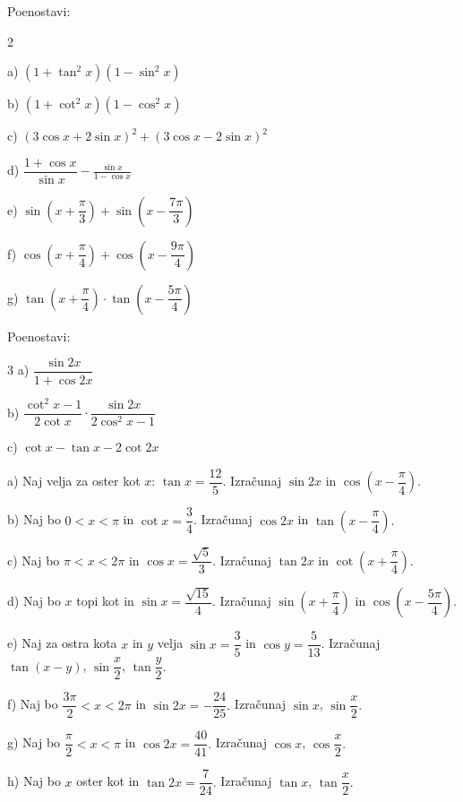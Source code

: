 \documentclass[a4paper,12pt]{letter}
\begin{document}
\begin{naloga}
Poenostavi:

    \vspace{-.5cm}
    
\begin{multicols}{2}
    
a) $(1+\tan^2 x)(1-\sin^2 x)$

b) $(1+\cot^2 x)(1-\cos^2 x)$

c) $(3\cos x+2\sin x)^2+(3\cos x-2\sin x)^2$

d) $\dfrac{1+\cos x}{\sin x}-\frac{\sin x}{1-\cos x}$

e) $\sin\left(x+\dfrac{\pi}{3}\right)+\sin\left(x-\dfrac{7\pi}{3}\right)$

f) $\cos\left(x+\dfrac{\pi}{4}\right)+\cos\left(x-\dfrac{9\pi}{4}\right)$

g) $\tan\left(x+\dfrac{\pi}{4}\right)\cdot \tan\left(x-\dfrac{5\pi}{4}\right) $
    
\end{multicols}
\end{naloga}
\begin{naloga}
    Poenostavi:
    \vspace{-.5cm}
    
\begin{multicols}
    {3}
        a) $\dfrac{\sin 2x}{1+\cos 2x}$

    b) $\dfrac{\cot^2 x -1}{2\cot x}\cdot \dfrac{\sin 2x}{2\cos^2 x-1}$

    c) $\cot x- \tan x -2\cot 2x$
\end{multicols}

\end{naloga}
\begin{naloga}
    a) Naj velja za oster kot $x$:  $\tan x=\dfrac{12}{5}$. Izračunaj $\sin 2x$  in $\cos(x-\dfrac{\pi}{4}).$

    b) Naj bo $0<x<\pi$ in   $\cot x=\dfrac{3}{4}$. Izračunaj $\cos 2x$ 
    in $\tan(x-\dfrac{\pi}{4}).$

    c) Naj bo $\pi<x<2\pi$ in   $\cos x=\dfrac{\sqrt{5}}{3}$. Izračunaj $\tan 2x$ in $\cot(x+\dfrac{\pi}{4}).$

    d) Naj bo $x$ topi kot in   $\sin x=\dfrac{\sqrt{15}}{4}$. Izračunaj $\sin(x+\dfrac{\pi}{4})$ in $\cos(x-\dfrac{5\pi}{4}).$

    e) Naj za ostra kota $x$ in $y$ velja $\sin x =\dfrac{3}{5}$ in $\cos y=\dfrac{5}{13}$. Izračunaj $\tan (x-y)$, $\sin \dfrac{x}{2}$, $\tan\dfrac{y}{2}.$

    f) Naj bo $\dfrac{3\pi}{2}<x<2\pi$ in  $\sin 2x = -\dfrac{24}{25}.$ Izračunaj $\sin x$, $\sin\dfrac{x}{2}.$

    g) Naj bo $\dfrac{\pi}{2}<x<\pi$ in $\cos 2x = \dfrac{40}{41}.$ Izračunaj $\cos x$, $\cos\dfrac{x}{2}.$

    h) Naj bo $x$ oster kot in $\tan 2x = \dfrac{7}{24}.$ Izračunaj $\tan x$, $\tan\dfrac{x}{2}.$
\end{naloga}
\end{document}
